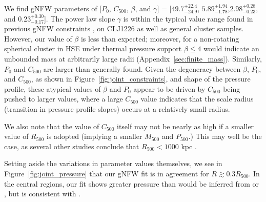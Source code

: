 \documentclass[twocolumn,traditabstract]{aa}
\begin{document}

We find gNFW parameters of [$P_0$, $C_{500}$, $\beta$, and $\gamma$] =
[$49.7_{-24.9}^{+22.4}$, $5.89_{-1.78}^{+1.94}$,$2.98_{-0.23}^{+0.28}$, and $0.23_{-0.17}^{+0.30}$].
The power law slope $\gamma$ is within the typical value range found in previous gNFW constraints
\citep[e.g]{nagai2007,arnaud2010,sayers2013},
on CLJ1226 as well as general cluster samples. However, our value of $\beta$ is less than expected;
moreover, for a non-rotating spherical cluster in HSE under thermal pressure support $\beta \le 4$ would
indicate an unbounded mass at arbitrarily large radii (Appendix~\ref{sec:finite_mass}).
Similarly, $P_0$ and $C_{500}$ are larger than generally found.
Given the degeneracy between $\beta$, $P_0$, and $C_{500}$, as shown in Figure~\ref{fig:joint_constraints},
and shape of the pressure profile, these atypical
values of $\beta$ and  $P_0$ appear to be driven by $C_{500}$ being pushed to larger values, where a large $C_{500}$
value indicates that the scale radius (transition in pressure profile slopes) occurs at a relatively small radius.

We also note that the value of $C_{500}$ itself may not be nearly as high if a smaller value of $R_{500}$
is adopted (implying a smaller $M_{500}$ and $P_{500}$.) This may well be the case, as several other
studies conclude that $R_{500} < 1000$ kpc \citep[e.g][]{rumsey2016,mroczkowski2009}.

Setting aside the variations in parameter values themselves, we see in Figure~\ref{fig:joint_pressure} that our
gNFW fit is in agreement for $R \gtrsim 0.3 R_{500}$. In the central regions, our fit shows greater pressure than
would be inferred from  or \citet{planck2013a}, but is consistent with \citet{romero2017}.
\end{document}
